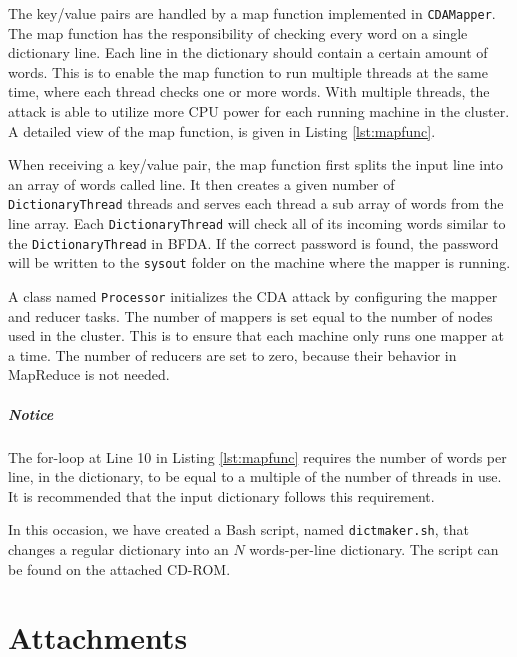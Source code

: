 \documentclass[pdftex,english,10pt,b5paper,twoside]{book}
\begin{document}
The key/value pairs are handled by a map function implemented in
\texttt{CDAMapper}. The
map function has the responsibility of checking every word on a single
dictionary line. Each line in the dictionary should contain a certain amount of
words. This is to enable the map function to run multiple threads at the same
time, where each thread checks one or more words. With multiple threads, the
attack is able to utilize more \ac{CPU} power for each running machine in the
cluster. A detailed view of the map function, is given in Listing
\ref{lst:mapfunc}.



When receiving a key/value pair, the map function first splits the input line
into an array of words called line. It then creates a given number of
\texttt{DictionaryThread} threads and serves each thread a sub array of words from the
line array. Each \texttt{DictionaryThread} will check all of its incoming words similar
to the \texttt{DictionaryThread} in BFDA. If the correct password is found, the
password will be written to the \texttt{sysout} folder on the machine where the mapper is
running.

A class named \texttt{Processor} initializes the \ac{CDA} attack by configuring
the mapper and reducer tasks. The number of mappers is set equal to the number
of nodes used in the cluster. This is to ensure that each machine only runs one
mapper at a time. The number of reducers are set to zero, because their
behavior in MapReduce is not needed.

\paragraph{Notice} The for-loop at Line 10 in Listing \ref{lst:mapfunc}
requires the number of words per line, in the dictionary, to be equal to a
multiple of the number of threads in use. It is recommended that the input
dictionary follows this requirement.

In this occasion, we have created a Bash script, named \texttt{dictmaker.sh},
that changes a regular dictionary into an $N$ words-per-line dictionary. The
script can be found on the attached CD-ROM.

\chapter{Attachments}
\label{ap:attachments}
\end{document}
